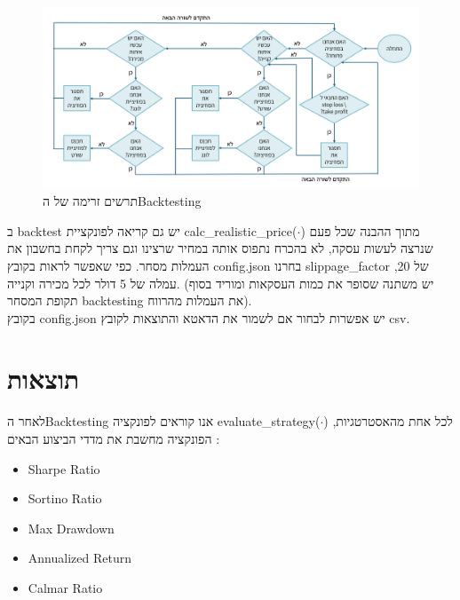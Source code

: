 \documentclass[a4paper,11pt]{article}
\newcommand{\te}[1]{\textenglish{#1}}
\begin{document}
\begin{RTL}
\begin{figure}[H]
    \centering
    \includegraphics[width=1\textwidth]{flow_chart.png}
    \caption{תרשים זרימה של ה\te{Backtesting}}
\end{figure}
ב \te{backtest} יש גם קריאה לפונקציית \te{calc\_realistic\_price($\cdot$)} מתוך ההבנה שכל פעם שנרצה לעשות עסקה, לא בהכרח נתפוס אותה במחיר שרצינו וגם צריך לקחת בחשבון את העמלות מסחר. כפי שאפשר לראות בקובץ \te{config.json} בחרנו \te{slippage\_factor} של 20, עמלה של 5 דולר לכל מכירה וקנייה. (יש משתנה שסופר את כמות העסקאות ומוריד בסוף תקופת המסחר \te{backtesting} את העמלות מהרווח).
\\ בקובץ \te{config.json} יש אפשרות לבחור אם לשמור את הדאטא והתוצאות לקובץ \te{csv}.
\section{תוצאות}
לאחר ה\te{Backtesting} אנו קוראים לפונקציה \te{evaluate\_strategy($\cdot$)} לכל אחת מהאסטרטגיות, הפונקציה מחשבת את מדדי הביצוע הבאים :
\begin{itemize}
    \item \te{Sharpe Ratio}
    \item \te{Sortino Ratio}
    \item \te{Max Drawdown}
    \item \te{Annualized Return}
    \item \te{Calmar Ratio}
\end{itemize}


\end{RTL}
\end{document}
